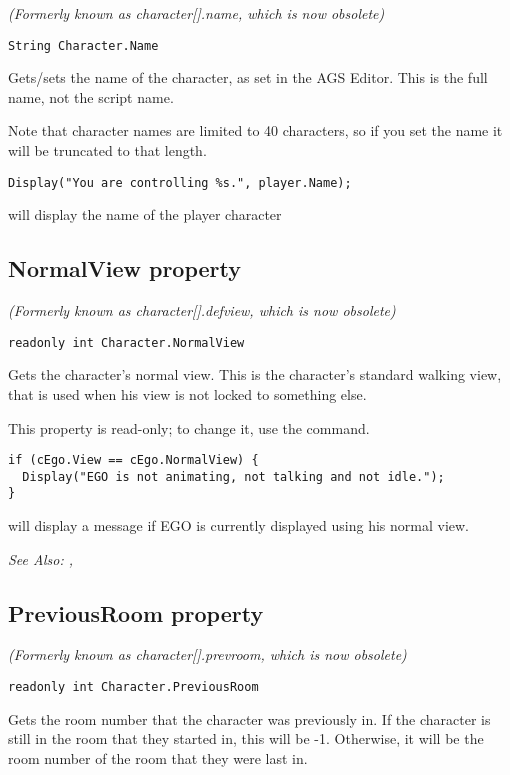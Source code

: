 \it{(Formerly known as character[].name, which is now obsolete)}

\begin{verbatim}
String Character.Name
\end{verbatim}
Gets/sets the name of the character, as set in the AGS Editor. This is the full name,
not the script name.

Note that character names are limited to 40 characters, so if you set the name it
will be truncated to that length.

\begin{verbatim}
Display("You are controlling %s.", player.Name);
\end{verbatim}
will display the name of the player character


\subsection{NormalView property}\label{Character.NormalView}%

\it{(Formerly known as character[].defview, which is now obsolete)}

\begin{verbatim}
readonly int Character.NormalView
\end{verbatim}
Gets the character's normal view. This is the character's standard walking view, that
is used when his view is not locked to something else.

This property is read-only; to change it, use the  command.

\begin{verbatim}
if (cEgo.View == cEgo.NormalView) {
  Display("EGO is not animating, not talking and not idle.");
}
\end{verbatim}
will display a message if EGO is currently displayed using his normal view.

\it{See Also:} ,


\subsection{PreviousRoom property}\label{Character.PreviousRoom}%

\it{(Formerly known as character[].prevroom, which is now obsolete)}

\begin{verbatim}
readonly int Character.PreviousRoom
\end{verbatim}
Gets the room number that the character was previously in. If the character is still
in the room that they started in, this will be -1. Otherwise, it will be the room number
of the room that they were last in.

